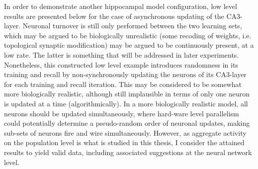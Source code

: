 
In order to demonstrate another hippocampal model configuration, low level results are presented below for the case of asynchronous updating of the CA3-layer. Neuronal turnover is still only performed between the two learning sets, which may be argued to be biologically unrealistic (some recoding of weights, i.e. topological synaptic modification) may be argued to be continuously present, at a low rate. The latter is something that will be addressed in later experiments. Nonetheless, this constructed low level example introduces randomness in its training and recall by non-synchronously updating the neurons of its CA3-layer for each training and recall iteration. This may be considered to be somewhat more biologically realistic, although still implausible in terms of only one neuron is updated at a time (algorithmically). In a more biologically realistic model, all neurons should be updated simultaneously, where hard-ware level parallelism could potentially determine a pseudo-random order of neuronal updates, making sub-sets of neurons fire and wire simultaneously. 
However, as aggregate activity on the population level is what is studied in this thesis, I consider the attained results to yield valid data, including associated suggestions at the neural network level.

